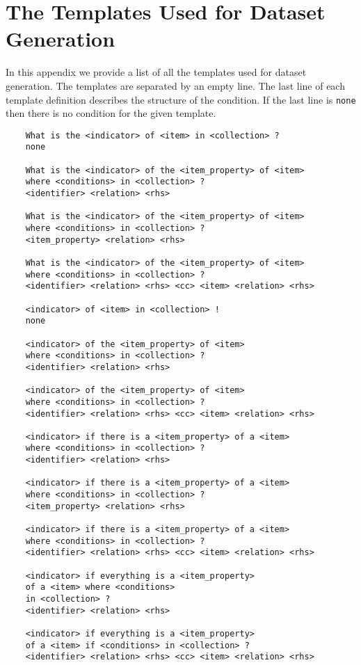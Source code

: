 \section{The Templates Used for Dataset Generation}

In this appendix we provide a list of all the templates used for dataset
generation. The templates are separated by an empty line. The last line of each
template definition describes the structure of the condition. If the last line
is \verb"none" then there is no condition for the given template.

\begingroup \fontsize{9pt}{7pt}\selectfont
    \begin{verbatim}
    What is the <indicator> of <item> in <collection> ?
    none

    What is the <indicator> of the <item_property> of <item>
    where <conditions> in <collection> ?
    <identifier> <relation> <rhs>

    What is the <indicator> of the <item_property> of <item>
    where <conditions> in <collection> ?
    <item_property> <relation> <rhs>
    
    What is the <indicator> of the <item_property> of <item>
    where <conditions> in <collection> ?
    <identifier> <relation> <rhs> <cc> <item> <relation> <rhs>

    <indicator> of <item> in <collection> !
    none

    <indicator> of the <item_property> of <item>  
    where <conditions> in <collection> ?
    <identifier> <relation> <rhs>

    <indicator> of the <item_property> of <item>  
    where <conditions> in <collection> ?
    <identifier> <relation> <rhs> <cc> <item> <relation> <rhs>

    <indicator> if there is a <item_property> of a <item> 
    where <conditions> in <collection> ?
    <identifier> <relation> <rhs>

    <indicator> if there is a <item_property> of a <item> 
    where <conditions> in <collection> ?
    <item_property> <relation> <rhs>

    <indicator> if there is a <item_property> of a <item> 
    where <conditions> in <collection> ?
    <identifier> <relation> <rhs> <cc> <item> <relation> <rhs>

    <indicator> if everything is a <item_property> 
    of a <item> where <conditions>
    in <collection> ?
    <identifier> <relation> <rhs>

    <indicator> if everything is a <item_property> 
    of a <item> if <conditions> in <collection> ?
    <identifier> <relation> <rhs> <cc> <item> <relation> <rhs>


\end{verbatim}
